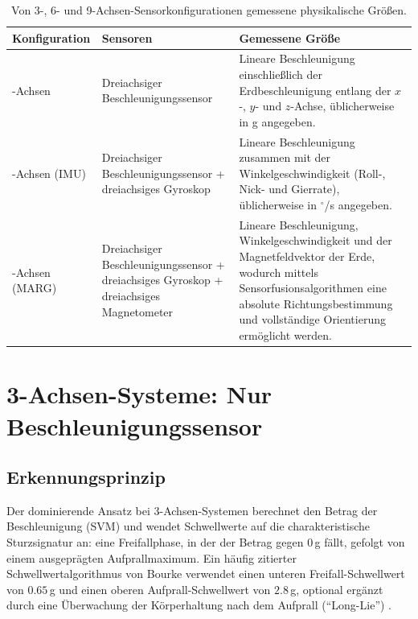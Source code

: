 \documentclass[11pt,a4paper,oneside]{report}
\begin{document}
\begin{table}[H]
\centering
\caption{Von 3-, 6- und 9-Achsen-Sensorkonfigurationen gemessene physikalische Größen.}
\label{tab:axes-overview}

\renewcommand{\arraystretch}{1.3}

\begin{tabularx}{\textwidth}{
>{\raggedright\arraybackslash}p{}
>{\raggedright\arraybackslash}p{}
>{\raggedright\arraybackslash}X}
\toprule
\textbf{Konfiguration} & \textbf{Sensoren} & \textbf{Gemessene Größe} \\
\midrule

3-Achsen
&
Dreiachsiger Beschleunigungssensor
&
Lineare Beschleunigung einschließlich der Erdbeschleunigung entlang der $x$-, $y$- und $z$-Achse, üblicherweise in g angegeben.
\\

6-Achsen (\ac{IMU})
&
Dreiachsiger Beschleunigungssensor + dreiachsiges Gyroskop
&
Lineare Beschleunigung zusammen mit der Winkelgeschwindigkeit (Roll-, Nick- und Gierrate), üblicherweise in $^\circ$/s angegeben.
\\

9-Achsen (\ac{MARG})
&
Dreiachsiger Beschleunigungssensor + dreiachsiges Gyroskop + dreiachsiges Magnetometer
&
Lineare Beschleunigung, Winkelgeschwindigkeit und der Magnetfeldvektor der Erde, wodurch mittels Sensorfusionsalgorithmen eine absolute Richtungsbestimmung und vollständige Orientierung ermöglicht werden.
\\

\bottomrule
\end{tabularx}
\end{table}

\section{3-Achsen-Systeme: Nur Beschleunigungssensor}
\label{sec:3axis}

\subsection{Erkennungsprinzip}
Der dominierende Ansatz bei 3-Achsen-Systemen berechnet den Betrag der
Beschleunigung (\ac{SVM}) und wendet Schwellwerte auf die charakteristische
Sturzsignatur an: eine Freifallphase, in der der Betrag gegen $0$\,g fällt,
gefolgt von einem ausgeprägten Aufprallmaximum. Ein häufig zitierter
Schwellwertalgorithmus von Bourke verwendet einen unteren Freifall-Schwellwert
von $0.65$\,g und einen oberen Aufprall-Schwellwert von $2.8$\,g, optional
ergänzt durch eine Überwachung der Körperhaltung nach dem Aufprall
(``Long-Lie'') \cite{bagala2012}.
\end{document}
